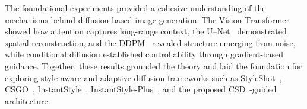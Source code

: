 The foundational experiments provided a cohesive understanding of the mechanisms behind diffusion-based image generation.  
The Vision Transformer~\cite{dosovitskiy2020vit} showed how attention captures long-range context, the U–Net~\cite{ronneberger2015unet} demonstrated spatial reconstruction, and the DDPM~\cite{ho2020ddpm} revealed structure emerging from noise, while conditional diffusion established controllability through gradient-based guidance.  
Together, these results grounded the theory and laid the foundation for exploring style-aware and adaptive diffusion frameworks such as StyleShot~\cite{gao2024styleshot}, CSGO~\cite{xing2024csgocomp}, InstantStyle~\cite{wang2024instantstyle}, InstantStyle-Plus~\cite{wang2024instantstyleplus}, and the proposed CSD~\cite{somepalli2024csd}-guided architecture.
